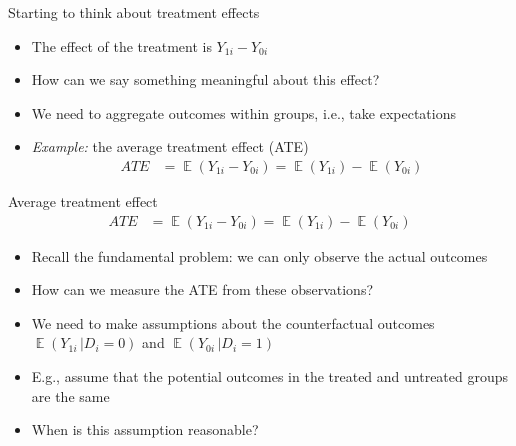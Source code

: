 \documentclass[aspectratio=169,compress,handout,t,xcolor=table]{beamer}
\DeclareMathOperator{\E}{\mathbb{E}}                       %
\begin{document}
\begin{frame}{Starting to think about treatment effects}
  \begin{itemize}
    \item The effect of the treatment is \(Y_{1i} - Y_{0i}\)
    \item How can we say something meaningful about this effect?
    \item We need to aggregate outcomes within groups, i.e., take expectations
    \item \emph{Example:} the average treatment effect (ATE)
    \begin{align*}
      ATE &= \E(Y_{1i} - Y_{0i}) = \E(Y_{1i}) - \E(Y_{0i})
    \end{align*}
  \end{itemize}
\end{frame}

\begin{frame}{Average treatment effect}
  \begin{align*}
    ATE &= \E(Y_{1i} - Y_{0i}) = \E(Y_{1i}) - \E(Y_{0i})
  \end{align*}
  \begin{itemize}
    \item Recall the fundamental problem: we can only observe the actual outcomes
    \item How can we measure the ATE from these observations?
    \item We need to make assumptions about the counterfactual outcomes \\ \(\E (Y_{1i} \, | D_i=0)\) and \(\E (Y_{0i} \, | D_i=1)\)
    \item E.g., assume that the potential outcomes in the treated and untreated groups \\ are the same
    \item When is this assumption reasonable?
  \end{itemize}
\end{frame}
\end{document}
